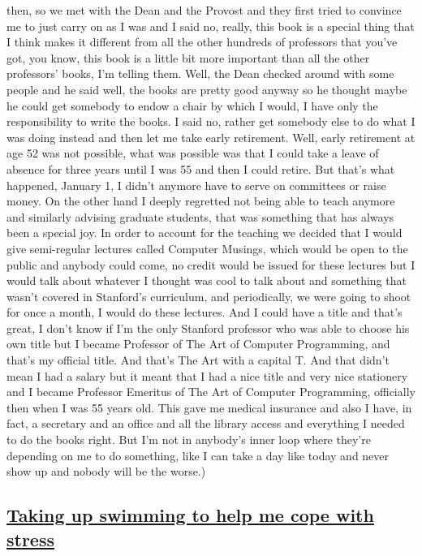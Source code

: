 \documentclass[]{article}
\begin{document}
then, so we met with the Dean and the Provost and they first tried to
convince me to just carry on as I was and I said no, really, this book
is a special thing that I think makes it different from all the other
hundreds of professors that you've got, you know, this book is a little
bit more important than all the other professors' books, I'm telling
them. Well, the Dean checked around with some people and he said well,
the books are pretty good anyway so he thought maybe he could get
somebody to endow a chair by which I would, I have only the
responsibility to write the books. I said no, rather get somebody else
to do what I was doing instead and then let me take early retirement.
Well, early retirement at age 52 was not possible, what was possible was
that I could take a leave of absence for three years until I was 55 and
then I could retire. But that's what happened, January 1, I didn't
anymore have to serve on committees or raise money. On the other hand I
deeply regretted not being able to teach anymore and similarly advising
graduate students, that was something that has always been a special
joy. In order to account for the teaching we decided that I would give
semi-regular lectures called Computer Musings, which would be open to
the public and anybody could come, no credit would be issued for these
lectures but I would talk about whatever I thought was cool to talk
about and something that wasn't covered in Stanford's curriculum, and
periodically, we were going to shoot for once a month, I would do these
lectures. And I could have a title and that's great, I don't know if I'm
the only Stanford professor who was able to choose his own title but I
became Professor of The Art of Computer Programming, and that's my
official title. And that's The Art with a capital T. And that didn't
mean I had a salary but it meant that I had a nice title and very nice
stationery and I became Professor Emeritus of The Art of Computer
Programming, officially then when I was 55 years old. This gave me
medical insurance and also I have, in fact, a secretary and an office
and all the library access and everything I needed to do the books
right. But I'm not in anybody's inner loop where they're depending on me
to do something, like I can take a day like today and never show up and
nobody will be the worse.)

\subsection{\texorpdfstring{\href{http://webofstories.com/play/17136}{Taking
up swimming to help me cope with
stress}}{Taking up swimming to help me cope with stress}}\label{taking-up-swimming-to-help-me-cope-with-stress}
\end{document}
